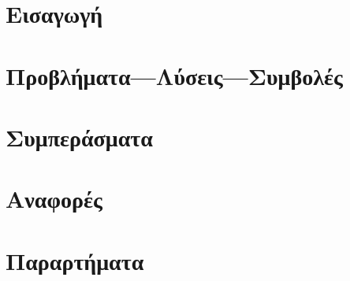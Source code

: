 





\part{Εισαγωγή}
  

\part{Προβλήματα---Λύσεις---Συμβολές}
  

\part{Συμπεράσματα}

\part{Αναφορές}
\printbibliography[heading=none]

\part{Παραρτήματα}
\appendix



